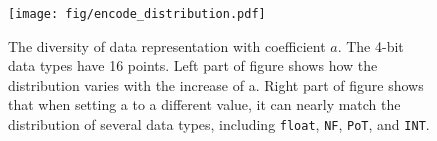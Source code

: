 \begin{figure}[t] 
    \centering 
    \texttt{[image: fig/encode\_distribution.pdf]}  
    \caption{The diversity of data representation with coefficient $a$. The 4-bit data types have 16 points. Left part of figure shows how the distribution varies with the increase of a. Right part of figure shows that when setting a to a different value, it can nearly match the distribution of several data types, including \texttt{float}, \texttt{NF}, \texttt{PoT}, and \texttt{INT}.}
    \label{fig:distribution}
\end{figure}